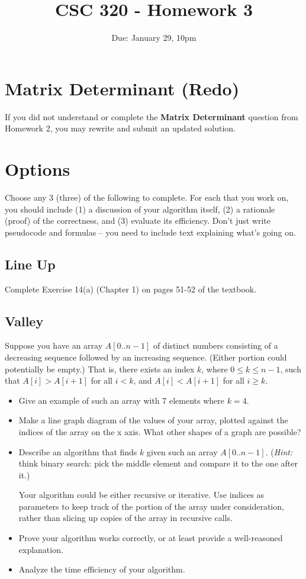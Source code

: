 \documentclass[12pt]{article}
\title{CSC 320 - Homework 3}
\author{}
\date{Due: January 29, 10pm}
\begin{document}
{\small \tableofcontents}

\section{Matrix Determinant (Redo)}

If you did not understand or complete the \textbf{Matrix Determinant} question from Homework 2, you may rewrite and submit an updated solution.

\section{Options}

Choose any 3 (three) of the following to complete. For each that you work on, you should include (1) a discussion of your algorithm itself, (2) a rationale (proof) of the correctness, and (3) evaluate its efficiency. Don't just write pseudocode and formulas -- you need to include text explaining what's going on.

\subsection{Line Up}

Complete Exercise 14(a) (Chapter 1) on pages 51-52 of the textbook.

\subsection{Valley}

Suppose you have an array $A[0..n-1]$ of distinct numbers consisting of a decreasing sequence followed by an increasing sequence. (Either portion could potentially be empty.) That is, there exists an index $k$, where $0 \leq k \leq n-1$, such that $A[i] > A[i+1]$ for all $i < k$, and $A[i] < A[i+1]$ for all $i \geq k$.

\begin{itemize}
    \item Give an example of such an array with 7 elements where $k = 4$.
    
    \item Make a line graph diagram of the values of your array, plotted against the indices of the array on the x axis. What other shapes of a graph are possible?

    \item Describe an algorithm that finds $k$ given such an array $A[0..n-1]$. (\emph{Hint:} think binary search: pick the middle element and compare it to the one after it.)
    
    Your algorithm could be either recursive or iterative. Use indices as parameters to keep track of the portion of the array under consideration, rather than slicing up copies of the array in recursive calls.

    \item Prove your algorithm works correctly, or at least provide a well-reasoned explanation.

    \item Analyze the time efficiency of your algorithm.
\end{itemize}
\end{document}

